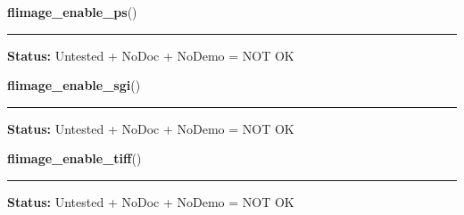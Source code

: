     \label{xformslib:library:flimage_enable_ps}

    \vspace{0.5ex}

\hspace{.8\funcindent}\begin{boxedminipage}{\funcwidth}

    \raggedright \textbf{flimage\_enable\_ps}()

    \vspace{-1.5ex}

    \rule{\textwidth}{0.5\fboxrule}
\setlength{\parskip}{2ex}
\setlength{\parskip}{1ex}
\textbf{Status:} Untested + NoDoc + NoDemo = NOT OK



    \end{boxedminipage}

    \label{xformslib:library:flimage_enable_sgi}

    \vspace{0.5ex}

\hspace{.8\funcindent}\begin{boxedminipage}{\funcwidth}

    \raggedright \textbf{flimage\_enable\_sgi}()

    \vspace{-1.5ex}

    \rule{\textwidth}{0.5\fboxrule}
\setlength{\parskip}{2ex}
\setlength{\parskip}{1ex}
\textbf{Status:} Untested + NoDoc + NoDemo = NOT OK



    \end{boxedminipage}

    \label{xformslib:library:flimage_enable_tiff}

    \vspace{0.5ex}

\hspace{.8\funcindent}\begin{boxedminipage}{\funcwidth}

    \raggedright \textbf{flimage\_enable\_tiff}()

    \vspace{-1.5ex}

    \rule{\textwidth}{0.5\fboxrule}
\setlength{\parskip}{2ex}
\setlength{\parskip}{1ex}
\textbf{Status:} Untested + NoDoc + NoDemo = NOT OK



    \end{boxedminipage}


